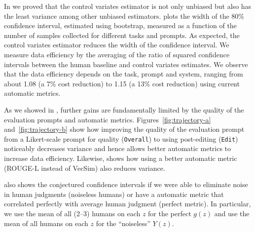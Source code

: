 In  we proved that the control variates estimator is not only unbiased but also has the least variance among other unbiased estimators.
 plots the width of the 80\% confidence interval, estimated using bootstrap, measured as a function of the number of samples collected for different tasks and prompts.
As expected, the control variates estimator reduces the width of the confidence interval. 
We measure data efficiency by the averaging of the ratio of squared confidence intervals between the human baseline and control variates estimates.
We observe that the data efficiency depends on the task, prompt and system, ranging from about 1.08 (a 7\% cost reduction) to 1.15 (a 13\% cost reduction) using current automatic metrics.

As we showed in , further gains are fundamentally limited by the quality of the evaluation prompts and automatic metrics.
Figures~\ref{fig:trajectory-a} and~\ref{fig:trajectory-b} show how improving the quality of the evaluation prompt from a Likert-scale prompt for quality (\texttt{Overall}) to using post-editing (\texttt{Edit}) noticeably decreases variance and hence allows better automatic metrics to increase data efficiency.
Likewise,  shows how using a better automatic metric (ROUGE-L instead of VecSim) also reduces variance.

 also shows the conjectured confidence intervals if we were able to eliminate noise in human judgments (noiseless humans) or have a automatic metric that correlated perfectly with average human judgment (perfect metric).
In particular, we use the mean of all (2--3) humans on each $z$ for the perfect $g(z)$ and use the mean of all humans on each $z$ for the ``noiseless'' $Y(z)$.

